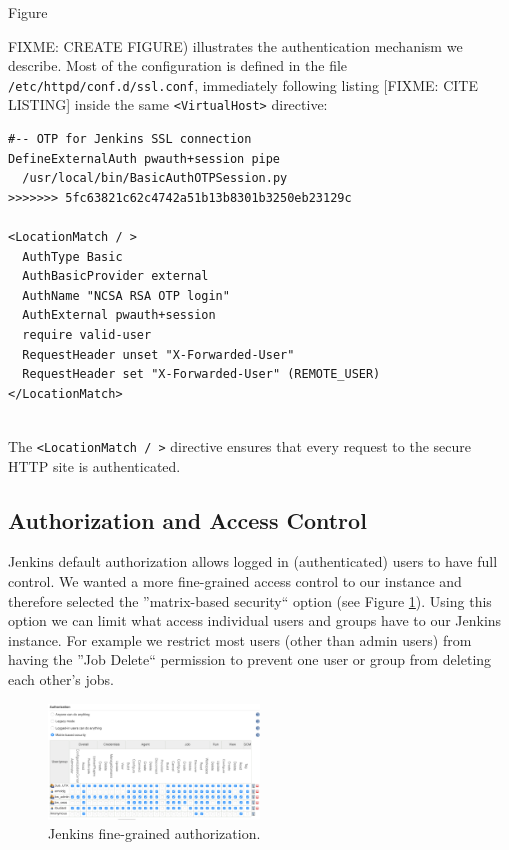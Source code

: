 \documentclass[10pt, conference, compsocconf]{IEEEtran}
\begin{document}
Figure {FIXME: CREATE FIGURE) illustrates the authentication mechanism we describe. 
Most of the configuration is defined in the file \texttt{/etc/httpd/conf.d/ssl.conf}, immediately following listing [FIXME: CITE LISTING] inside the same \texttt{<VirtualHost>} directive:

\begin{lstlisting}
#-- OTP for Jenkins SSL connection
DefineExternalAuth pwauth+session pipe 
  /usr/local/bin/BasicAuthOTPSession.py
>>>>>>> 5fc63821c62c4742a51b13b8301b3250eb23129c

<LocationMatch / > 
  AuthType Basic
  AuthBasicProvider external
  AuthName "NCSA RSA OTP login" 
  AuthExternal pwauth+session
  require valid-user  
  RequestHeader unset "X-Forwarded-User"
  RequestHeader set "X-Forwarded-User" (REMOTE_USER)
</LocationMatch>
 
\end{lstlisting}
The \texttt{<LocationMatch / >} directive ensures that every request to the secure HTTP site is authenticated. 

\subsection{Authorization and Access Control}
\label{subsec:authorization}

Jenkins default authorization allows logged in (authenticated) users to have full control. 
We wanted a more fine-grained access control to our instance and therefore selected the ''matrix-based security`` option (see Figure \ref{fig:jenkinsAuthorization}). Using this option we can limit what access individual users and groups have to our Jenkins instance. 
For example we restrict most users (other than admin users) from having the ''Job Delete`` permission to prevent one user or group from deleting each other's jobs. 

\begin{figure}[h]
\centering
\includegraphics[width=0.5\textwidth]{Configure-Global-Security}
\caption{Jenkins fine-grained authorization.}
\label{fig:jenkinsAuthorization}
\end{figure}

}
\end{document}
